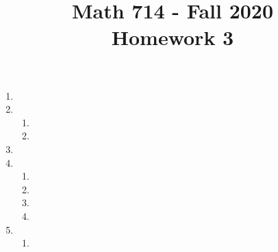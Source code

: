 \documentclass{article}
\title{Math 714 - Fall 2020\\
        {\Large \textbf{Homework 3}}
    }
\date{}
\numberwithin{equation}{section}
\begin{document}
    \maketitle
    \section{}
    \begin{enumerate}[label=(\alph*)]
        \item 
        
        \item \begin{enumerate}[label=\roman*]
            \item 
            \item 
        \end{enumerate}
        \item 
        \item \begin{enumerate}[label=\roman*]
            \item 
            \item 
            \item 
            \item 
        \end{enumerate}
        \item \begin{enumerate}[label=\roman*]
            \item 
        \end{enumerate}
    \end{enumerate}
\end{document}
